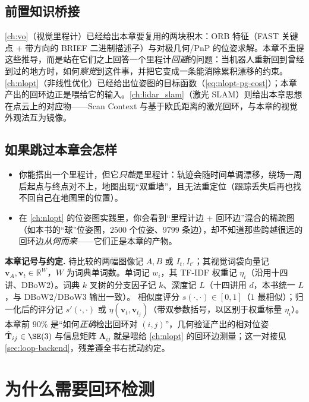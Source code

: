 \subsection*{前置知识桥接}
\cref{ch:vo}（视觉里程计）已经给出本章要复用的两块积木：ORB 特征（FAST 关键点 + 带方向的 BRIEF 二进制描述子）与对极几何/PnP 的位姿求解。本章不重提这些推导，而是站在它们之上回答一个里程计\emph{回避}的问题：当机器人重新回到曾经到过的地方时，如何\emph{察觉}到这件事，并把它变成一条能消除累积漂移的约束。\cref{ch:nlopt}（非线性优化）已经给出位姿图的目标函数（\cref{eq:nlopt-pg-cost}）；本章产出的回环边正是喂给它的输入。\cref{ch:lidar_slam}（激光 SLAM）则给出本章思想在点云上的对应物——Scan Context 与基于欧氏距离的激光回环\cite{kim2018scancontext}，与本章的视觉外观法互为镜像。

\subsection*{如果跳过本章会怎样}
\begin{itemize}
  \item 你能搭出一个里程计，但它\emph{只能}是里程计：轨迹会随时间单调漂移，绕场一周后起点与终点对不上，地图出现“双重墙”，且无法重定位（跟踪丢失后再也找不回自己在地图里的位置）。
  \item 在 \cref{ch:nlopt} 的位姿图实践里，你会看到“里程计边 + 回环边”混合的稀疏图（如本书的“球”位姿图，$2500$ 个位姿、$9799$ 条边），却不知道那些跨越很远的回环边\emph{从何而来}——它们正是本章的产物。
\end{itemize}

\begin{note}
\textbf{本章记号与约定.}\;
待比较的两幅图像记 $A,B$ 或 $I_t,I_{t'}$；其视觉词袋向量记 $\boldsymbol v_A,\boldsymbol v_t\in\mathbb{R}^W$，$W$ 为词典单词数。单词记 $w_i$，其 TF-IDF 权重记 $\eta_i$（沿用十四讲\cite{gaoxiang2019slam14}、DBoW2\cite{galvez2012bags}）。词典 $k$ 叉树的分支因子记 $k$、深度记 $L$（十四讲用 $d$，本书统一 $L$，与 DBoW2/DBoW3 输出一致）。
相似度评分 $s(\cdot,\cdot)\in[0,1]$（$1$ 最相似）；归一化后的评分记 $s'(\cdot,\cdot)$ 或 $\eta(\boldsymbol v_t,\boldsymbol v_{t_j})$（带双参数括号，以区别于权重标量 $\eta_i$）。
本章前 $90\%$ 是“如何\emph{正确}检出回环对 $(i,j)$”，几何验证产出的相对位姿 $\hat{\mathbf T}_{ij}\in\SE(3)$ 与信息矩阵 $\boldsymbol\Lambda_{ij}$ 就是喂给 \cref{ch:nlopt} 的回环边测量；这一对接见 \cref{sec:loop-backend}，残差遵全书右扰动约定。
\end{note}

\section{为什么需要回环检测}
\label{sec:loop-why}

